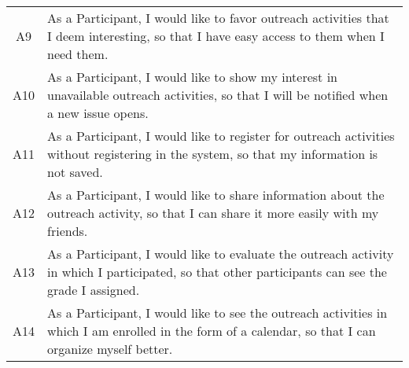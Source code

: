 \begin{table}[!htb]
\begin{tabularx}{\textwidth}{c|X}
    \rowcolor[rgb]{0.898,0.898,0.898} A9          & As a Participant, I would like to favor outreach activities that I deem interesting, so that I have easy access to them when I need them.                                \\
    A10                                           & As a Participant, I would like to show my interest in unavailable outreach activities, so that I will be notified when a new issue opens.                              \\
    \rowcolor[rgb]{0.898,0.898,0.898} A11         & As a Participant, I would like to register for outreach activities without registering in the system, so that my information is not saved.                                \\
    A12                                           & As a Participant, I would like to share information about the outreach activity, so that I can share it more easily with my friends.                              \\
    \rowcolor[rgb]{0.898,0.898,0.898} A13         & As a Participant, I would like to evaluate the outreach activity in which I participated, so that other participants can see the grade I assigned.                                \\
    A14                                           & As a Participant, I would like to see the outreach activities in which I am enrolled in the form of a calendar, so that I can organize myself better.                              \\
    \bottomrule
  \end{tabularx}
\end{table}